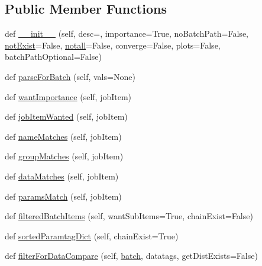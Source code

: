 \subsection*{Public Member Functions}
\begin{DoxyCompactItemize}
\item 
def \mbox{\hyperlink{classparamgrid_1_1batchjob__args_1_1batchArgs_a08e7f06c80273e155efbb4e5706adc92}{\+\_\+\+\_\+init\+\_\+\+\_\+}} (self, desc=\textquotesingle{}\textquotesingle{}, importance=True, no\+Batch\+Path=False, \mbox{\hyperlink{classparamgrid_1_1batchjob__args_1_1batchArgs_ad2924073b3302cd932a6a446491f7f14}{not\+Exist}}=False, \mbox{\hyperlink{classparamgrid_1_1batchjob__args_1_1batchArgs_a4dc6c78becc0fe37a40bf286afdffc80}{notall}}=False, converge=False, plots=False, batch\+Path\+Optional=False)
\item 
def \mbox{\hyperlink{classparamgrid_1_1batchjob__args_1_1batchArgs_a37274b1efbc3629d80309590047a068f}{parse\+For\+Batch}} (self, vals=None)
\item 
def \mbox{\hyperlink{classparamgrid_1_1batchjob__args_1_1batchArgs_ae80716e61fbcf0943666ca8400b6cfa2}{want\+Importance}} (self, job\+Item)
\item 
def \mbox{\hyperlink{classparamgrid_1_1batchjob__args_1_1batchArgs_ac0e9731c58a0587b3d66dc7e66c64316}{job\+Item\+Wanted}} (self, job\+Item)
\item 
def \mbox{\hyperlink{classparamgrid_1_1batchjob__args_1_1batchArgs_ae95b522ede37bae834c0aeb9edafebe9}{name\+Matches}} (self, job\+Item)
\item 
def \mbox{\hyperlink{classparamgrid_1_1batchjob__args_1_1batchArgs_ad71f394b5efdfc1226017edd39273606}{group\+Matches}} (self, job\+Item)
\item 
def \mbox{\hyperlink{classparamgrid_1_1batchjob__args_1_1batchArgs_a2837820592cdee214b7afc3dfd2a2b13}{data\+Matches}} (self, job\+Item)
\item 
def \mbox{\hyperlink{classparamgrid_1_1batchjob__args_1_1batchArgs_a1fb8df013bcf146d0800765b40f9b91d}{params\+Match}} (self, job\+Item)
\item 
def \mbox{\hyperlink{classparamgrid_1_1batchjob__args_1_1batchArgs_a1367a161802a65eaeba85b94b487943e}{filtered\+Batch\+Items}} (self, want\+Sub\+Items=True, chain\+Exist=False)
\item 
def \mbox{\hyperlink{classparamgrid_1_1batchjob__args_1_1batchArgs_a50b0de280c5e65044725927a0e174d3f}{sorted\+Paramtag\+Dict}} (self, chain\+Exist=True)
\item 
def \mbox{\hyperlink{classparamgrid_1_1batchjob__args_1_1batchArgs_ad84b8f825a979fdfae36954030815ba6}{filter\+For\+Data\+Compare}} (self, \mbox{\hyperlink{classparamgrid_1_1batchjob__args_1_1batchArgs_ac81fe201dd1936846f35238f74dc92de}{batch}}, datatags, get\+Dist\+Exists=False)
\end{DoxyCompactItemize}
